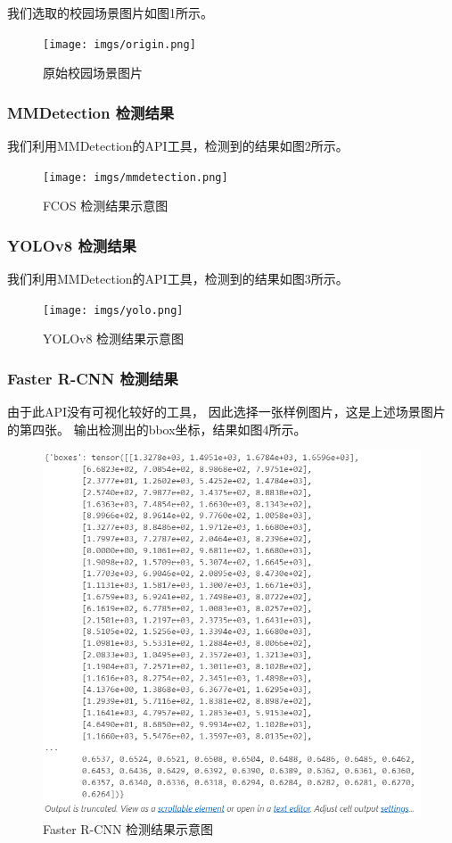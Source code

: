 我们选取的校园场景图片如图1所示。
\begin{figure}[h!]
    \centering
    \texttt{[image: imgs/origin.png]}
    \caption{原始校园场景图片}
    \label{fig:origin_image}
\end{figure}

\subsubsection{MMDetection 检测结果}
我们利用MMDetection的API工具，检测到的结果如图2所示。

\begin{figure}[h!]
    \centering
    \texttt{[image: imgs/mmdetection.png]}
    \caption{FCOS 检测结果示意图}
    \label{fig:fcos_result}
\end{figure}


\subsubsection{YOLOv8 检测结果}
我们利用MMDetection的API工具，检测到的结果如图3所示。

\begin{figure}[h!]
    \centering
    \texttt{[image: imgs/yolo.png]}
    \caption{YOLOv8 检测结果示意图}
    \label{fig:yolov8_result}
\end{figure}

\subsubsection{Faster R-CNN 检测结果}
由于此API没有可视化较好的工具，
因此选择一张样例图片，这是上述场景图片的第四张。
输出检测出的bbox坐标，结果如图4所示。

\begin{figure}[h!]
    \centering
    \includegraphics[width=\textwidth]{imgs/fast_res.png}
    \caption{Faster R-CNN 检测结果示意图}
    \label{fig:fasterrcnn_result}
\end{figure}


